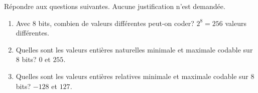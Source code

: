 \documentclass[a4paper,10pt]{report}
\def\ptsexoA{3}
\def\ptsexoB{3}
\begin{document}

\renewcommand{\labelitemi}{\textbullet} %


\pagestyle{DS_FP}          %
\NomPrenomNote{}


\exods{\ptsexoA}

Répondre aux questions suivantes. Aucune justification n'est demandée.

\begin{enumerate}
    \item Avec 8 bits, combien de valeurs différentes peut-on coder? $2^8=256$ valeurs différentes.
    \item Quelles sont les valeurs entières naturelles minimale et maximale codable sur 8 bits? $0$ et $255$.
    \item Quelles sont les valeurs entières relatives minimale et maximale codable sur 8 bits? $-128$ et $127$.
\end{enumerate}


\exods{\ptsexoB}
\end{document}

